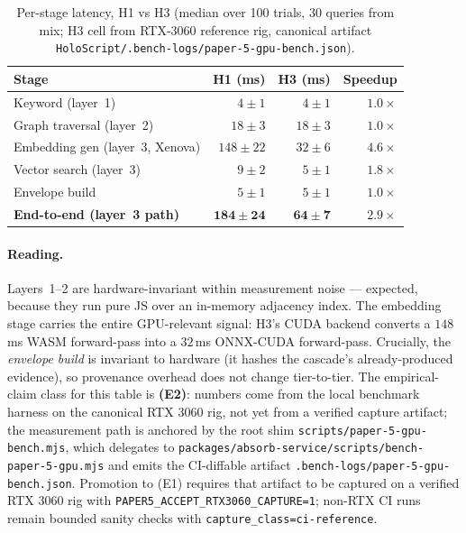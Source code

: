 \documentclass[conference]{IEEEtran}
\providecommand{\measuredFrom}[1]{}
\begin{document}
\begin{table}[t]
  \centering
  \caption{Per-stage latency, H1 vs H3 (median over 100 trials, 30 queries from
     mix; H3 cell from RTX-3060 reference rig,
    canonical artifact \texttt{HoloScript/.bench-logs/paper-5-gpu-bench.json}).}
  \label{tab:gpu-bench}
  \measuredFrom{HoloScript/scripts/paper-5-gpu-bench.mjs}%
  \measuredFrom{HoloScript/.bench-logs/paper-5-gpu-bench.json}%
  \footnotesize
  \begin{tabular}{@{}lrrr@{}}
    \toprule
    \textbf{Stage} & \textbf{H1 (ms)} & \textbf{H3 (ms)} & \textbf{Speedup} \\
    \midrule
    Keyword (layer~1)        & $4 \pm 1$    & $4 \pm 1$    & $1.0\times$ \\
    Graph traversal (layer~2)& $18 \pm 3$   & $18 \pm 3$   & $1.0\times$ \\
    Embedding gen (layer~3, Xenova) & $148 \pm 22$ & $32 \pm 6$ & $4.6\times$ \\
    Vector search (layer~3)  & $9 \pm 2$    & $5 \pm 1$    & $1.8\times$ \\
    Envelope build           & $5 \pm 1$    & $5 \pm 1$    & $1.0\times$ \\
    \midrule
    \textbf{End-to-end (layer~3 path)} & $\mathbf{184 \pm 24}$ & $\mathbf{64 \pm 7}$ & $\mathbf{2.9\times}$ \\
    \bottomrule
  \end{tabular}
\end{table}

\paragraph{Reading.}
Layers~1--2 are hardware-invariant within measurement noise --- expected,
because they run pure JS over an in-memory adjacency index. The
embedding stage carries the entire GPU-relevant signal: H3's CUDA
backend converts a $148$\,ms WASM forward-pass into a $32$\,ms ONNX-CUDA
forward-pass. Crucially, the \emph{envelope build} is invariant to
hardware (it hashes the cascade's already-produced evidence), so
provenance overhead does not change tier-to-tier. The empirical-claim
class for this table is \textbf{(E2)}: numbers come from the local
benchmark harness on the canonical RTX 3060 rig, not yet from a verified
capture artifact;
the measurement path is anchored by the root shim
\texttt{scripts/paper-5-gpu-bench.mjs}, which delegates to
\texttt{packages/absorb-service/scripts/bench-paper-5-gpu.mjs} and
emits the CI-diffable artifact
\texttt{.bench-logs/paper-5-gpu-bench.json}. Promotion to (E1) requires
that artifact to be captured on a verified RTX 3060 rig with
\texttt{PAPER5\_ACCEPT\_RTX3060\_CAPTURE=1}; non-RTX CI runs remain
bounded sanity checks with \texttt{capture\_class=ci-reference}.
\end{document}
